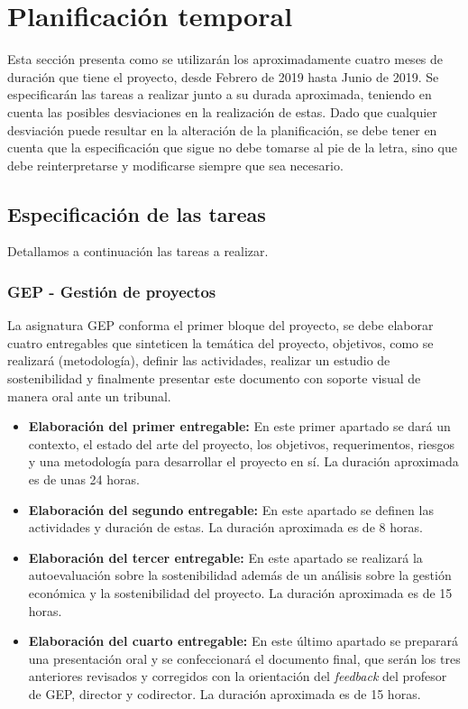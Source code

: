 \section{Planificación temporal}

Esta sección presenta como se utilizarán los aproximadamente cuatro meses de duración que tiene el proyecto, desde Febrero de 2019 hasta Junio de 2019. Se especificarán las tareas a realizar junto a su durada aproximada, teniendo en cuenta las posibles desviaciones en la realización de estas. Dado que cualquier desviación puede resultar en la alteración de la planificación, se debe tener en cuenta que la especificación que sigue no debe tomarse al pie de la letra, sino que debe reinterpretarse y modificarse siempre que sea necesario. 

\subsection{Especificación de las tareas}

Detallamos a continuación las tareas a realizar.

\subsubsection{GEP - Gestión de proyectos}

La asignatura GEP conforma el primer bloque del proyecto, se debe elaborar cuatro entregables que sinteticen la temática del proyecto, objetivos, como se realizará (metodología), definir las actividades, realizar un estudio de sostenibilidad y finalmente presentar este documento con soporte visual de manera oral ante un tribunal.

\begin{itemize}
 \item \textbf{Elaboración del primer entregable:} En este primer apartado se dará un contexto, el estado del arte del proyecto, los objetivos, requerimentos, riesgos y una metodología para desarrollar el proyecto en sí. La duración aproximada es de unas 24 horas.
 \item \textbf{Elaboración del segundo entregable:} En este apartado se definen las actividades y duración de estas. La duración aproximada es de 8 horas.
 \item \textbf{Elaboración del tercer entregable:} En este apartado se realizará la autoevaluación sobre la sostenibilidad además de un análisis sobre la gestión económica y la sostenibilidad del proyecto. La duración aproximada es de 15 horas.
 \item \textbf{Elaboración del cuarto entregable:} En este último apartado se preparará una presentación oral y se confeccionará el documento final, que serán los tres anteriores revisados y corregidos con la orientación del \textit{feedback} del profesor de GEP, director y codirector. La duración aproximada es de 15 horas.
\end{itemize}

